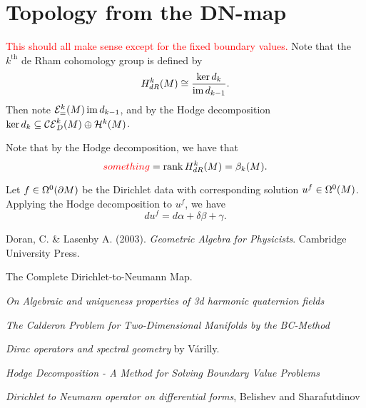 \documentclass[12pt]{article}
\begin{document}
\section{Topology from the DN-map}

\textcolor{red}{This should all make sense except for the fixed boundary values.}
Note that the $k^\textrm{th}$ de Rham cohomology group is defined by
\[
H^k_{dR}(M) \cong \frac{\ker d_k}{\im d_{k-1}}.
\]
Then note $\exact{k}=\im d_{k-1}$, and by the Hodge decomposition $\ker d_k \subseteq \coexact{k}{D}\oplus \harmonic{k}{}$.

Note that by the Hodge decomposition, we have that
\[
\textcolor{red}{something} =\operatorname{rank} H^k_{dR}(M) = \beta_k(M).
\]


Let $f\in \boundarykforms{0}$ be the Dirichlet data with corresponding solution $u^f \in \kforms{0}{}$.  Applying the Hodge decomposition to $u^f$, we have
\[
du^f = d\alpha + \delta \beta + \gamma.
\] 



\newpage
\begin{thebibliography}{1}
	
	 Doran, C. \& Lasenby A. (2003). \emph{Geometric Algebra for Physicists}. Cambridge University Press.
	
	 The Complete Dirichlet-to-Neumann Map.
	
	 \emph{On Algebraic and uniqueness properties of 3d harmonic quaternion fields}
	
	 \emph{The Calderon Problem for Two-Dimensional Manifolds by the BC-Method}
	
	 \emph{Dirac operators and spectral geometry} by V\'arilly.
	
	 \emph{Hodge Decomposition - A Method for Solving Boundary Value Problems}
	
	 \emph{Dirichlet to Neumann operator on differential forms}, Belishev and Sharafutdinov
	
\end{thebibliography}
\end{document}
